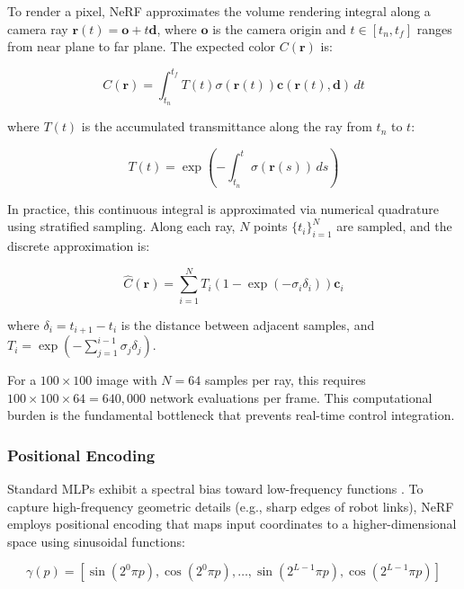 \documentclass[12pt,a4paper,oneside]{report}
\begin{document}
To render a pixel, NeRF approximates the volume rendering integral along a camera ray $\mathbf{r}(t) = \mathbf{o} + t\mathbf{d}$, where $\mathbf{o}$ is the camera origin and $t \in [t_n, t_f]$ ranges from near plane to far plane. The expected color $C(\mathbf{r})$ is:

\begin{equation}
C(\mathbf{r}) = \int_{t_n}^{t_f} T(t) \sigma(\mathbf{r}(t)) \mathbf{c}(\mathbf{r}(t), \mathbf{d}) \, dt
\end{equation}

where $T(t)$ is the accumulated transmittance along the ray from $t_n$ to $t$:

\begin{equation}
T(t) = \exp\left(-\int_{t_n}^{t} \sigma(\mathbf{r}(s)) \, ds\right)
\end{equation}

In practice, this continuous integral is approximated via numerical quadrature using stratified sampling. Along each ray, $N$ points $\{t_i\}_{i=1}^N$ are sampled, and the discrete approximation is:

\begin{equation}
\hat{C}(\mathbf{r}) = \sum_{i=1}^{N} T_i (1 - \exp(-\sigma_i \delta_i)) \mathbf{c}_i
\end{equation}

where $\delta_i = t_{i+1} - t_i$ is the distance between adjacent samples, and $T_i = \exp\left(-\sum_{j=1}^{i-1} \sigma_j \delta_j\right)$.

For a $100 \times 100$ image with $N = 64$ samples per ray, this requires $100 \times 100 \times 64 = 640,000$ network evaluations per frame. This computational burden is the fundamental bottleneck that prevents real-time control integration.

\subsubsection{Positional Encoding}
\label{subsubsec:positional_encoding}

Standard MLPs exhibit a spectral bias toward low-frequency functions \cite{rahaman2019spectral}. To capture high-frequency geometric details (e.g., sharp edges of robot links), NeRF employs positional encoding that maps input coordinates to a higher-dimensional space using sinusoidal functions:

\begin{equation}
\gamma(p) = [\sin(2^0 \pi p), \cos(2^0 \pi p), \ldots, \sin(2^{L-1} \pi p), \cos(2^{L-1} \pi p)]
\end{equation}
\end{document}
